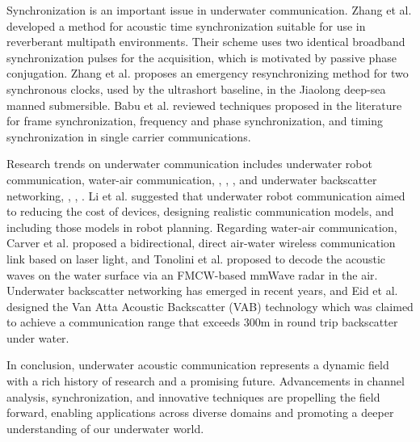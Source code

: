 \documentclass[11pt, oneside]{article}   	%
\begin{document}
Synchronization is an important issue in underwater communication. Zhang et al.\cite{syncreceiver09} developed a method for acoustic time synchronization suitable for use in reverberant multipath environments. Their scheme uses two identical broadband synchronization pulses for the acquisition, which is motivated by passive phase conjugation. Zhang et al.\cite{jiaolong19} proposes an emergency resynchronizing method for two synchronous clocks, used by the ultrashort baseline, in the Jiaolong deep-sea manned submersible. Babu et al.\cite{synctech23} reviewed techniques proposed in the literature for frame synchronization, frequency and phase synchronization, and timing synchronization in single carrier communications.

Research trends on underwater communication includes underwater robot communication\cite{commtrend23}, water-air communication\cite{ref:amphilight20}, \cite{ref:sunflower22}, \cite{waterair18}, \cite{aman2022underwater}, and underwater backscatter networking\cite{ref:backscatter23}, \cite{ref:vanatta23}, \cite{backscatter19}, \cite{wideband20}. Li et al.\cite{commtrend23} suggested that underwater robot communication aimed to reducing the cost of devices, designing realistic communication models, and including those models in robot planning. Regarding water-air communication, Carver et al.\cite{ref:amphilight20} proposed a bidirectional, direct air-water wireless communication link based on laser light, and Tonolini et al.\cite{waterair18} proposed to decode the acoustic waves on the water surface via an FMCW-based mmWave radar in the air. Underwater backscatter networking has emerged in recent years, and Eid et al.\cite{ref:vanatta23} designed the Van Atta Acoustic Backscatter (VAB) technology which was claimed to achieve a communication range that exceeds 300m in round trip backscatter under water.

In conclusion, underwater acoustic communication represents a dynamic field with a rich history of research and a promising future. Advancements in channel analysis, synchronization, and innovative techniques are propelling the field forward, enabling applications across diverse domains and promoting a deeper understanding of our underwater world.







\end{document}
